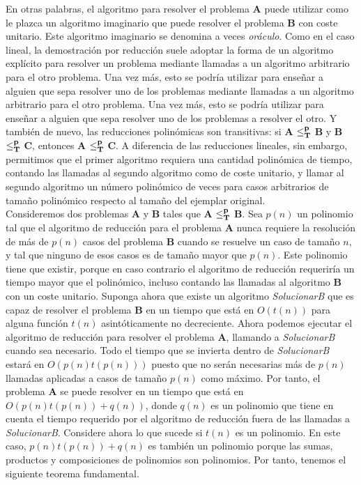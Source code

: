 En otras palabras, el algoritmo para resolver el problema \textbf{A} puede utilizar como le plazca un algoritmo imaginario que puede resolver el problema \textbf{B} con coste unitario. Este algoritmo imaginario se denomina a veces \emph{oráculo}. Como en el caso lineal, la demostración por reducción suele adoptar la forma de un algoritmo explícito para resolver un problema mediante llamadas a un algoritmo arbitrario para el otro problema. Una vez más, esto se podría utilizar para enseñar a alguien que sepa resolver uno de los problemas mediante llamadas a un algoritmo arbitrario para el otro problema. Una vez más, esto se podría utilizar para enseñar a alguien que sepa resolver uno de los problemas a resolver el otro. Y también de nuevo, las reducciones polinómicas son transitivas: si \textbf{A} $\bf{\leq} _{T}^p$ \textbf{B} y \textbf{B} $\bf{\leq} _{T}^p$ \textbf{C}, entonces \textbf{A} $\bf{\leq} _{T}^p$ \textbf{C}. A diferencia de las reducciones lineales, sin embargo, permitimos que el primer algoritmo requiera una cantidad polinómica de tiempo, contando las llamadas al segundo algoritmo como de coste unitario, y llamar al segundo algoritmo un número polinómico de veces para casos arbitrarios de tamaño polinómico respecto al tamaño del ejemplar original.\\

Consideremos dos problemas \textbf{A} y \textbf{B} tales que \textbf{A} $\bf{\leq}_{T}^p$ \textbf{B}. Sea $p(n)$ un polinomio tal que el algoritmo de reducción para el problema \textbf{A} nunca requiere la resolución de más de $p(n)$ casos del problema \textbf{B} cuando se resuelve un caso de tamaño $n$, y tal que ninguno de esos casos es de tamaño mayor que $p(n)$. Este polinomio tiene que existir, porque en caso contrario el algoritmo de reducción requeriría un tiempo mayor que el polinómico, incluso contando las llamadas al algoritmo \textbf{B} con un coste unitario. Suponga ahora que existe un algoritmo \emph{SolucionarB} que es capaz de resolver el problema \textbf{B} en un tiempo que está en $O(t(n))$ para alguna función $t(n)$ asintóticamente no decreciente. Ahora podemos ejecutar el algoritmo de reducción para resolver el problema \textbf{A}, llamando a \emph{SolucionarB} cuando sea necesario. Todo el tiempo que se invierta dentro de \emph{SolucionarB} estará en $O(p(n)t(p(n)))$ puesto que no serán necesarias más de $p(n)$ llamadas aplicadas a casos de tamaño $p(n)$ como máximo. Por tanto, el problema \textbf{A} se puede resolver en un tiempo que está en $O(p(n)t(p(n)) + q(n))$, donde $q(n)$ es un polinomio que tiene en cuenta el tiempo requerido por el algoritmo de reducción fuera de las llamadas a \emph{SolucionarB}. Considere ahora lo que sucede si $t(n)$ es un polinomio. En este caso, $p(n)t(p(n)) + q(n)$ es también un polinomio porque las sumas, productos y composiciones de polinomios son polinomios. Por tanto, tenemos el siguiente teorema fundamental.

